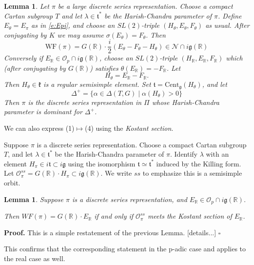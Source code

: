 \documentclass[10pt,leqno]{article}
\newtheorem{lemma}[equation]{Lemma}
\newcommand{\qed}{\hfill $\square$ \medskip}
\newenvironment{proof}[1][Proof]{\noindent\textbf{#1.} }{\qed}
\newcommand{\Cent}{\mathrm{Cent}}
\renewcommand{\O}{\mathcal O}
\newcommand{\R}{\mathbb R}
\newcommand{\N}{\mathcal N}
\newcommand{\G}{G}
\renewcommand{\k}{\mathfrak k}
\renewcommand{\t}{\mathfrak t}
\newcommand{\g}{\mathfrak g}
\newcommand{\WF}{\mathrm{WF}}
\newcommand{\Op}{\O_p}
\begin{document}
\begin{lemma}
  Let $\pi$ be a large discrete series representation.
Choose a compact Cartan subgroup $T$ and let $\lambda\in \t^*$ be the Harish-Chandra parameter of $\pi$.
Define $E_\theta=E_\pi$ as in \eqref{e:Epi}, and choose an $SL(2)$-triple $(H_\theta,E_\theta,F_\theta)$ as usual.
After conjugating by $K$ we may assume $\sigma(E_\theta)=F_\theta$.  Then
$$
\WF(\pi)=G(\R)\cdot\frac i2(E_\theta-F_\theta-H_\theta)\in\N\cap i\g(\R)
$$
Conversely if $E_\R\in \Op\cap i\g(\R)$, choose an $SL(2)$-triple $(H_\R,E_\R,F_\R)$ which (after conjugating by $G(\R)$) satisfies $\theta(E_\R)=-F_\R$.
Let
$$
H_\theta=E_\R-F_\R.
$$
Then $H_\theta\in\k$ is a regular semisimple element.
Set $\t=\Cent_{\g}(H_\theta)$, and let
$$
\Delta^+=\{\alpha\in\Delta(T,G)\mid  \alpha(H_\theta)>0\}
$$
Then $\pi$ is the discrete series representation in $\Pi$ whose Harish-Chandra parameter is dominant for $\Delta^+$. 
\end{lemma}

We can also express (1)$\mapsto$(4) using the {\it Kostant section}.

Suppose $\pi$ is a discrete series representation.
Choose a compact Cartan subgroup $T$, and let $\lambda\in\t^*$ be the Harish-Chandra parameter of $\pi$.
Identify $\lambda$ with an element $H_\pi\in i\t\subset i\g$ using the isomorphism $\t\simeq \t^*$ induced by the Killing form. 
Let $\O^{ss}_\pi=G(\R)\cdot H_\pi\subset i\g(\R)$. We write $ss$ to emphasize this is a semisimple orbit.


\begin{lemma}
  Suppose $\pi$ is a discrete series representation, and $E_\R\in\Op\cap i\g(\R)$.

  Then $WF(\pi)=\G(\R)\cdot E_\R$ if and only if
$\O^{ss}_\pi$ meets the Kostant section of $E_\R$.
\end{lemma}

\begin{proof}
  This is a simple restatement of the previous Lemma.  [details...]
\end{proof}

This confirms that  the corresponding statement  in the p-adic case \cite{debacker_reeder_generic} and \cite{kaletha_epipelagic}
applies to the real case as well.


\end{document}
